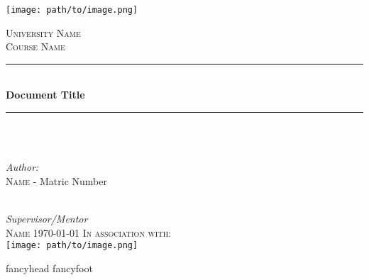 \documentclass[12pt]{article}
\begin{document}
%
\begin{titlepage}



\texttt{[image: path/to/image.png]}

%

\newcommand{\HRule}{\rule{\linewidth}{0.5mm}} %

\center %
 
\textsc{\LARGE University Name}\\[1cm] %
\textsc{\Large Course Name}\\[0.5cm] %

\HRule \\[0.5cm]
{ \LARGE \bfseries Document Title}\\ %
\HRule \\[1cm]
 
\\[1cm]

\begin{minipage}{0.4\textwidth}
\begin{flushleft} \large
\centering


\emph{Author:}\\
\textsc{Name} - Matric Number \\%
\end{flushleft}
\end{minipage}
\\[1cm]
\emph{Supervisor/Mentor} \\
\textsc{Name}
\vfill
{\large \today} %
\vfill
\textsc{\large In association with:}\\[0.5cm]

\texttt{[image: path/to/image.png]}

\end{titlepage}

\setcounter{page}{1}
{
    fancyhead{}
    fancyfoot{}
}
\end{document}
